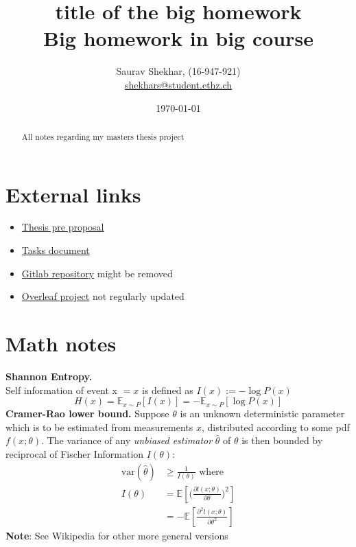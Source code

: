 \documentclass[letterpaper]{article}
\title{
  {\bf title of the big homework }\\
  \large Big homework in big course }
\author{Saurav Shekhar, (16-947-921)\\
  \href{mailto:shekhars@student.ethz.ch}{shekhars@student.ethz.ch}}
\date{\today}
\newcommand{\comment}[1]{\textcolor{OliveGreen}{#1}}
\newcommand{\EE}[1]{\mathbb{E}\left[#1\right]}
\newcommand{\EEE}[2]{\mathbb{E}_{#1}\left[#2\right]}
\newcommand{\mypar}[1]{{\bf #1.}}
\begin{document}
  \maketitle
  \begin{abstract}
    All notes regarding my masters thesis project
  \end{abstract}
  
  \section{External links}
  \begin{itemize}
    \item \href{https://docs.google.com/document/d/1GMczTKs5-JKIgxfFOKv1yJNKLoUHZ0pqwR15xZcgyYQ/edit?usp=sharing}{Thesis pre proposal}
    \item \href{https://docs.google.com/document/d/1Ytcuj1QJ8Xs5gzXVYbvcsjwsGGyz7HEg0_nCRAXjbgg/edit}{Tasks document}
    \item \href{https://gitlab.ethz.ch/shekhars/msc-thesis}{Gitlab repository} \comment{might be removed}
    \item \href{https://www.overleaf.com/9925566564xbszbcfbycnd}{Overleaf project} \comment{not regularly updated}
  \end{itemize}

   \newpage
  
   \newpage

  \section{Math notes}
  \mypar{Shannon Entropy} \\
  Self information of event x $= x$ is defined as $I(x) := -\log P(x)$
  $$
  H(x) = \EEE{x \sim P}{I(x)} = -\EEE{x \sim P}{\log P(x)}
  $$
  \mypar{Cramer-Rao lower bound} \cite{math-stat16} 
  Suppose $\theta$ is an unknown deterministic parameter which is to be estimated from
  measurements $x$, distributed according to some pdf $f(x; \theta)$. The variance of any 
  \textit{unbiased estimator} $\hat{\theta}$ of $\theta$ is then bounded by reciprocal of
  Fischer Information $I(\theta)$:
  \begin{align}
    \text{var}(\hat{\theta}) &\geq \frac{1}{I(\theta)} \text{ where }\nonumber\\
    I(\theta) &= \EE{\Big(\frac{\partial l(x; \theta)}{\partial \theta}\Big)^2} \nonumber\\
         &= -\EE{\frac{\partial^2 l(x; \theta)}{\partial \theta^2}} \nonumber
  \end{align}
  {\bf Note}: See Wikipedia for other more general versions
\end{document}
